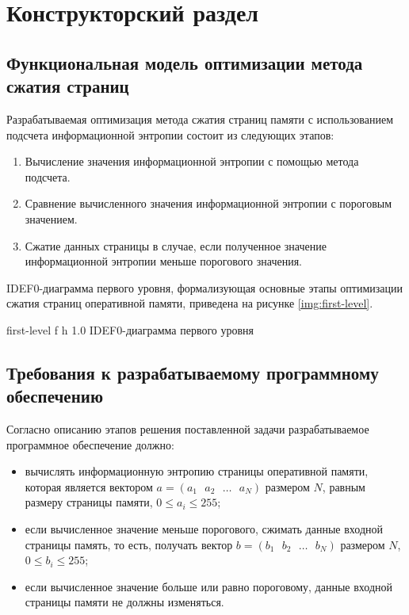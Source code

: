 \chapter{Конструкторский раздел}

\section{Функциональная модель оптимизации метода сжатия страниц}

Разрабатываемая оптимизация метода сжатия страниц памяти с использованием подсчета информационной энтропии состоит из следующих этапов:

\begin{enumerate}
	\item Вычисление значения информационной энтропии с помощью метода подсчета.
	\item Сравнение вычисленного значения информационной энтропии с пороговым значением.
	\item Сжатие данных страницы в случае, если полученное значение информационной энтропии меньше порогового значения.
\end{enumerate}

IDEF0-диаграмма первого уровня, формализующая основные этапы оптимизации сжатия страниц оперативной памяти, приведена на рисунке \ref{img:first-level}.
    
    {first-level}
    {f}
    {h}
    {1.0\textwidth}
    {IDEF0-диаграмма первого уровня}

\section{Требования к разрабатываемому программному обеспечению}

Согласно описанию этапов решения поставленной задачи разрабатываемое программное обеспечение должно:

\begin{itemize}
	\item вычислять информационную энтропию страницы оперативной памяти, которая является вектором $a = (a_1\text{ }a_2\text{ }\dotso\text{ }a_N)$ размером $N$, равным размеру страницы памяти, $0 \leq a_i \leq 255$;
	\item если вычисленное значение меньше порогового, сжимать данные входной страницы память, то есть, получать вектор $b = (b_1\text{ }b_2\text{ }\dotso\text{ }b_N)$ размером $N$, $0 \leq b_i \leq 255$;
	\item если вычисленное значение больше или равно пороговому, данные входной страницы памяти не должны изменяться.
\end{itemize}

